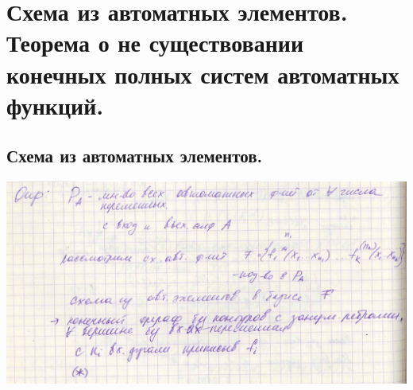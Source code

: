 \documentclass[12pt]{article}
\begin{document}
\section{Схема из автоматных элементов. Теорема о не существовании конечных полных систем автоматных функций.}
\subsection{Схема из автоматных элементов.}
	\includegraphics[width=500pt]{44}
\end{document}
